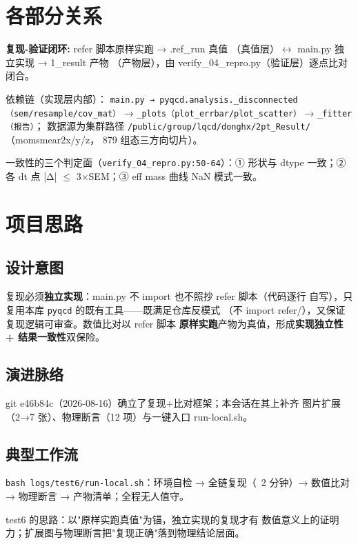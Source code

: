 \documentclass[UTF8]{ctexart}
\begin{document}
\section{各部分关系}
\begin{keybox}
\textbf{复现-验证闭环:} \textcolor{relation}{refer 脚本原样实跑 → .ref\_run 真值}
（真值层）$\leftrightarrow$ \textcolor{relation}{main.py 独立实现 → 1\_result 产物}
（产物层），由 \textcolor{relation}{verify\_04\_repro.py}（验证层）逐点比对闭合。
\end{keybox}

依赖链（实现层内部）：
\texttt{main.py → pyqcd.analysis.\_disconnected（sem/resample/cov\_mat）}
→ \texttt{\_plots（plot\_errbar/plot\_scatter）} → \texttt{\_fitter（报告）}；
数据源为集群路径 \texttt{/public/group/lqcd/donghx/2pt\_Result/}（momsmear2x/y/z，
879 组态三方向切片）。

一致性的三个判定面（\texttt{verify\_04\_repro.py:50-64}）：① 形状与 dtype
一致；② 各 dt 点 |Δ| $\le$ 3$\times$SEM；③ eff mass 曲线 NaN 模式一致。

\section{项目思路}
\subsection{设计意图}
复现必须\textbf{独立实现}：main.py 不 import 也不照抄 refer 脚本（代码逐行
自写），只复用本库 \texttt{pyqcd} 的既有工具——既满足仓库反模式
（不 import refer/），又保证复现逻辑可审查。数值比对以 refer 脚本
\textbf{原样实跑}产物为真值，形成\textbf{实现独立性 + 结果一致性}双保险。
\subsection{演进脉络}
git e46b84c（2026-08-16）确立了复现+比对框架；本会话在其上补齐
图片扩展（2→7 张）、物理断言（12 项）与一键入口 run-local.sh。
\subsection{典型工作流}
\texttt{bash logs/test6/run-local.sh}：环境自检 → 全链复现（~2 分钟）→
数值比对 → 物理断言 → 产物清单；全程无人值守。
\begin{ideabox}
\textcolor{idea}{test6 的思路：以"原样实跑真值"为锚，独立实现的复现才有
  数值意义上的证明力；扩展图与物理断言把"复现正确"落到物理结论层面。}
\end{ideabox}
\end{document}
